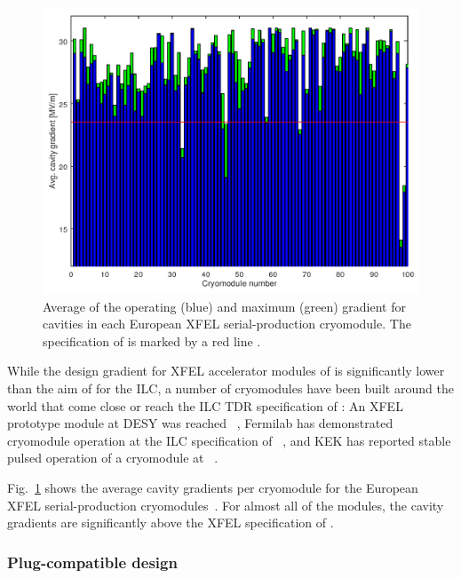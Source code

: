 \begin{figure}[htbp]
   \includegraphics[width=\hsize]{chapters/figures/srf17-mopb106-fig1}
\caption{Average of the operating (blue) and maximum
(green) gradient for cavities in each European XFEL serial-production cryomodule.
The specification of  is marked by a red line
\cite{Kasprzak:2018kkr}.
}
\label{fig:cryomodules-performance}
\end{figure}

While the design gradient for XFEL accelerator modules of  is significantly lower than the aim of  for the ILC, a number of cryomodules have been built around the world that come close or reach the ILC TDR specification of : An XFEL prototype module at DESY was reached ~\cite{Kostin:2009a}, Fermilab has demonstrated cryomodule operation at the ILC specification of ~\cite{Broemmelsiek:2018iqr}, and KEK has reported stable pulsed operation of a cryomodule at ~\cite{Yamamoto:2018kml}.

Fig.~\ref{fig:cryomodules-performance} shows the average cavity gradients per cryomodule for the European XFEL serial-production cryomodules~\cite{Kasprzak:2018kkr}. 
For almost all of the modules, the cavity gradients are significantly above the XFEL specification of .


\subsubsection{Plug-compatible design}

